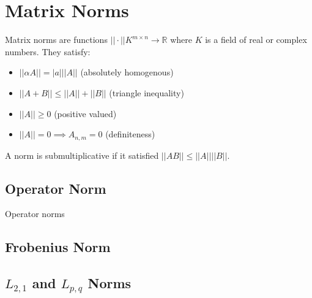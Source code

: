 \section{Matrix Norms}

Matrix norms are functions $||\cdot|| K^{m\times n} \rightarrow \mathbb{R}$ where $K$ is a field of real or complex numbers. They satisfy:

\begin{itemize}
\item $||\alpha A|| = |a| ||A||$ (absolutely homogenous)
\item $||A+B|| \leq ||A|| + ||B||$ (triangle inequality)
\item $||A||\geq 0$ (positive valued)
\item $||A||=0 \implies A_{n,m}=0$ (definiteness)
\end{itemize}

A norm is submultiplicative if it satisfied $||AB||\leq||A||||B||$.

\subsection{Operator Norm}
Operator norms 


\subsection{Frobenius Norm}


\subsection{$L_{2,1}$ and $L_{p,q}$ Norms}
